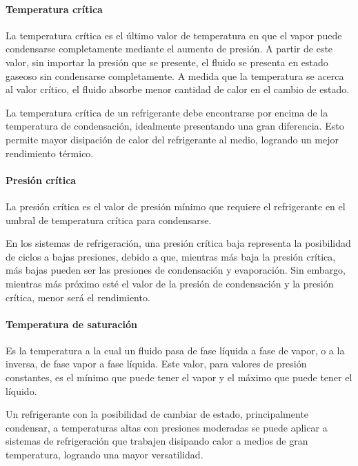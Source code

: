 
	\paragraph{Temperatura crítica} La temperatura crítica es el último valor de temperatura en que el vapor puede condensarse completamente mediante el aumento de presión. A partir de este valor, sin importar la presión que se presente, el fluido se presenta en estado gaseoso sin condensarse completamente. A medida que la temperatura se acerca al valor crítico, el fluido absorbe menor cantidad de calor en el cambio de estado.

	La temperatura crítica de un refrigerante debe encontrarse por encima de la temperatura de condensación, idealmente presentando una gran diferencia. Esto permite mayor disipación de calor del refrigerante al medio, logrando un mejor rendimiento térmico.
	
	\paragraph{Presión crítica} La presión crítica es el valor de presión mínimo que requiere el refrigerante en el umbral de temperatura crítica para condensarse. 

	En los sistemas de refrigeración, una presión crítica baja representa la posibilidad de ciclos a bajas presiones, debido a que, mientras más baja la presión crítica, más bajas pueden ser las presiones de condensación y evaporación. Sin embargo, mientras más próximo esté el valor de la presión de condensación y la presión crítica, menor será el rendimiento.
	
	\paragraph{Temperatura de saturación} Es la temperatura a la cual un fluido pasa de fase líquida a fase de vapor, o a la inversa, de fase vapor a fase líquida. Este valor, para valores de presión constantes, es el mínimo que puede tener el vapor y el máximo que puede tener el líquido.
	
	Un refrigerante con la posibilidad de cambiar de estado, principalmente condensar, a temperaturas altas con presiones moderadas se puede aplicar a sistemas de refrigeración que trabajen disipando calor a medios de gran temperatura, logrando una mayor versatilidad. 

